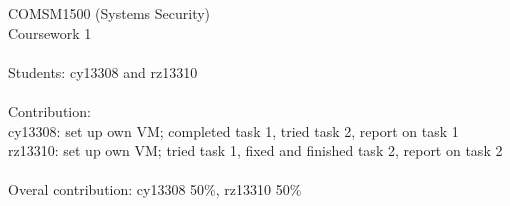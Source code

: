 \documentclass{article}
\newcommand\tab[1][1cm]{\hspace*{#1}}
\begin{document}
COMSM1500 (Systems Security)\\
Coursework 1\\
\\
Students: cy13308 and rz13310 \\
\\
Contribution: \\
\tab[1cm] cy13308: set up own VM; completed task 1, tried task 2, report on task 1\\
\tab[1cm] rz13310: set up own VM; tried task 1, fixed and finished task 2, report on task 2
\\
\\
Overal contribution: cy13308 50\%, rz13310 50\%

\newpage

\newpage




% 
% 
\end{document}
